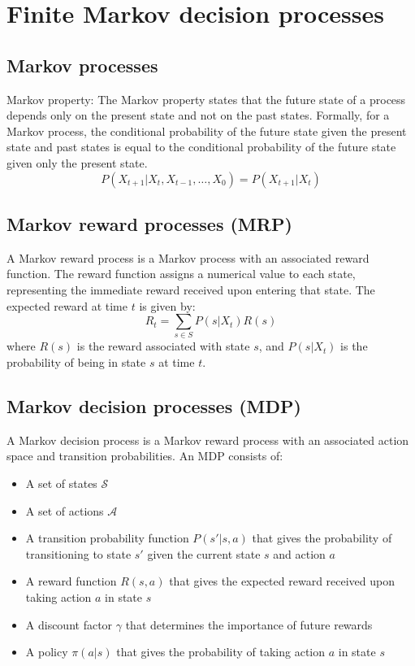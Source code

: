 \section{Finite Markov decision processes}

\subsection{Markov processes}

Markov property:
The Markov property states that the future state of a process depends only on the present state and not on the past states.
Formally, for a Markov process, the conditional probability of the future state given the present state and past states is equal to the conditional probability of the future state given only the present state.
\begin{equation}
    P(X_{t+1} | X_t, X_{t-1}, \ldots, X_0) = P(X_{t+1} | X_t)
\end{equation}

\subsection{Markov reward processes (MRP)}

A Markov reward process is a Markov process with an associated reward function.
The reward function assigns a numerical value to each state, representing the immediate reward received upon entering that state.
The expected reward at time \( t \) is given by:
\begin{equation}
    R_t = \sum_{s \in S} P(s | X_t) R(s)
\end{equation}
where \( R(s) \) is the reward associated with state \( s \), and \( P(s | X_t) \) is the probability of being in state \( s \) at time \( t \).

\subsection{Markov decision processes (MDP)}

A Markov decision process is a Markov reward process with an associated action space and transition probabilities.
An MDP consists of:
\begin{itemize}
    \item A set of states \( \mathcal{S} \)
    \item A set of actions \( \mathcal{A} \)
    \item A transition probability function \( P(s' | s, a) \) that gives the probability of transitioning to state \( s' \) given the current state \( s \) and action \( a \)
    \item A reward function \( R(s, a) \) that gives the expected reward received upon taking action \( a \) in state \( s \)
    \item A discount factor \( \gamma \) that determines the importance of future rewards
    \item A policy \( \pi(a | s) \) that gives the probability of taking action \( a \) in state \( s \)
\end{itemize}
